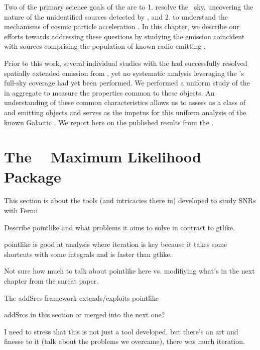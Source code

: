 {Two of the primary science goals of the \lat{}  are to 1. resolve the \gam~sky, uncovering the nature of the unidentified sources detected by \egret{}, and 2. to understand the mechanisms of cosmic particle acceleration \citep{atwood09}. In this chapter, we describe our efforts towards addressing these questions by studying the \gam{} emission coincident with sources comprising the population of known radio emitting \snrs{}.

Prior to this work, several individual studies with the \lat{} had successfully resolved spatially extended emission from \snrs{} \citep[and references therein]{3FGL}, yet no systematic analysis leveraging the \lat{}'s full-sky coverage had yet been performed. We performed a uniform study of the \snrs{} in aggregate to measure the properties common to these objects. An understanding of these common characteristics allows us to assess \snrs{} as a class of \gam{} and \cray{} emitting objects and serves as the impetus for this uniform analysis of the known Galactic \snrs{}. We  report here on the published results from the \snrcat{} \cite{SNRcat}. 
 

\section{\label{snrCat:ptlk}The \ptlike~  Maximum Likelihood Package}

This section is about the tools (and intricacies there in) developed to study SNRs with Fermi

Describe pointlike and what problems it aims to solve in contrast to gtlike.

pointlike is good at analysis where iteration is key because it takes some shortcuts with some integrals and is faster than gtlike. 

Not sure how much to talk about pointlike here vs. modifiying what's in the next chapter from the snrcat paper. 

The addSrcs framework extends/exploits pointlike 

addSrcs in this section or merged into the next one?

I need to stress that this is not just a tool developed, but there's an art and finesse to it (talk about the problems we overcame), there was much iteration.

}
